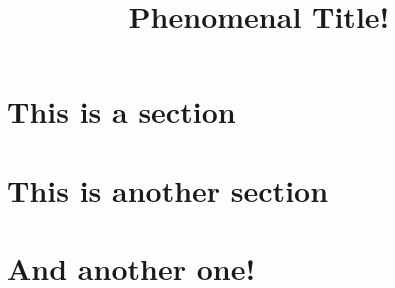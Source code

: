 \documentclass[german]{fhnwfactsheet}
\title{Phenomenal Title!}
\begin{document}
\begin{factpage}

\begin{overview}
    \lipsum[2]
\end{overview}


\begin{content}

    \tableofcontents

    \section{This is a section}
    \lipsum[2-3]
    \section{This is another section}
    \lipsum[4]
    \section{And another one!}
    \lipsum[5]

\end{content}

\end{factpage}
\end{document}
